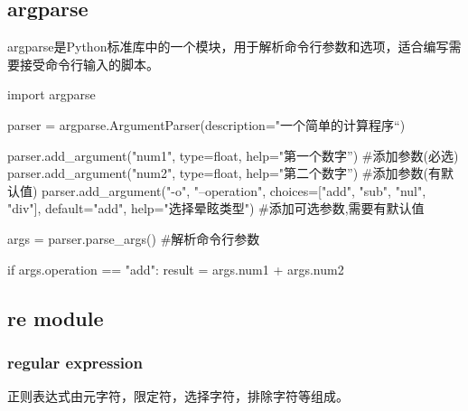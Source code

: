   \subsection{argparse}
    argparse是Python标准库中的一个模块，用于解析命令行参数和选项，适合编写需要接受命令行输入的脚本。
    \begin{codeblock}[language=python, caption={argparse}]
      import argparse

      parser = argparse.ArgumentParser(description="一个简单的计算程序“)
      
      parser.add_argument("num1", type=float, help="第一个数字”) #添加参数(必选)
      parser.add_argument("num2", type=float, help="第二个数字”) #添加参数(有默认值)
      parser.add_argument("-o", "--operation", choices=["add", "sub", "nul", "div"],
          default="add", help="选择晕眩类型") #添加可选参数,需要有默认值

      args = parser.parse_args() #解析命令行参数

      if args.operation == "add":
         result = args.num1 + args.num2
    \end{codeblock}

  \subsection{re module}
  
    \subsubsection{regular expression}
      正则表达式由元字符，限定符，选择字符，排除字符等组成。

